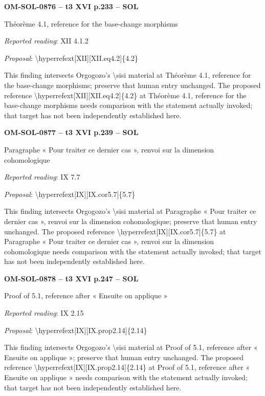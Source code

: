 \par\noindent\textbf{OM-SOL-0876 -- t3 XVI p.233 -- SOL}\par
Théorème 4.1, reference for the base-change morphisms\par
\emph{Reported reading}: XII 4.1.2\par
\emph{Proposal}: \textbackslash{}hyperrefext[XII][XII.eq4.2]\{4.2\}\par
This finding intersects Orgogozo's \textbackslash{}sisi material at Théorème 4.1, reference for the base-change morphisms; preserve that human entry unchanged. The proposed reference \textbackslash{}hyperrefext[XII][XII.eq4.2]\{4.2\} at Théorème 4.1, reference for the base-change morphisms needs comparison with the statement actually invoked; that target has not been independently established here.\par
\par\noindent\textbf{OM-SOL-0877 -- t3 XVI p.239 -- SOL}\par
Paragraphe « Pour traiter ce dernier cas », renvoi sur la dimension cohomologique\par
\emph{Reported reading}: IX 7.7\par
\emph{Proposal}: \textbackslash{}hyperrefext[IX][IX.cor5.7]\{5.7\}\par
This finding intersects Orgogozo's \textbackslash{}sisi material at Paragraphe « Pour traiter ce dernier cas », renvoi sur la dimension cohomologique; preserve that human entry unchanged. The proposed reference \textbackslash{}hyperrefext[IX][IX.cor5.7]\{5.7\} at Paragraphe « Pour traiter ce dernier cas », renvoi sur la dimension cohomologique needs comparison with the statement actually invoked; that target has not been independently established here.\par
\par\noindent\textbf{OM-SOL-0878 -- t3 XVI p.247 -- SOL}\par
Proof of 5.1, reference after « Ensuite on applique »\par
\emph{Reported reading}: IX 2.15\par
\emph{Proposal}: \textbackslash{}hyperrefext[IX][IX.prop2.14]\{2.14\}\par
This finding intersects Orgogozo's \textbackslash{}sisi material at Proof of 5.1, reference after « Ensuite on applique »; preserve that human entry unchanged. The proposed reference \textbackslash{}hyperrefext[IX][IX.prop2.14]\{2.14\} at Proof of 5.1, reference after « Ensuite on applique » needs comparison with the statement actually invoked; that target has not been independently established here.\par
